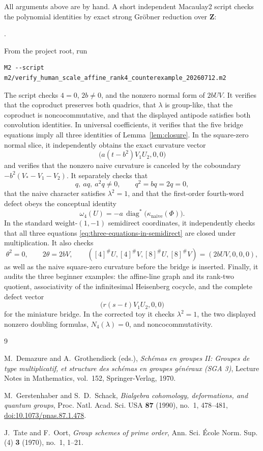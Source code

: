 \documentclass[11pt]{amsart}
\theoremstyle{definition}
\theoremstyle{remark}
\newcommand{\Z}{\mathbf Z}
\begin{document}
All arguments above are by hand.  A short independent Macaulay2 script
checks the polynomial identities by exact strong Gr\"obner reduction over
\(\Z\):
\begin{center}
 .
\end{center}
From the project root, run
\begin{verbatim}
M2 --script m2/verify_human_scale_affine_rank4_counterexample_20260712.m2
\end{verbatim}
The script checks \(4=0\), \(2b\ne0\), and the nonzero normal form of
\(2bUV\).  It verifies that the coproduct preserves both quadrics, that
\(\lambda\) is group-like, that the coproduct is noncocommutative, and
that the displayed antipode satisfies both convolution identities.  In
universal coefficients, it verifies that the five bridge equations imply
all three identities of Lemma~\ref{lem:closure}.  In the square-zero
normal slice, it independently obtains the exact curvature vector
\[
 \bigl(a(t-b^2)V_1U_2,0,0\bigr)
\]
and verifies that the nonzero naive curvature is canceled by the
coboundary \(-b^2(V_*-V_1-V_2)\).  It separately checks that
\[
 q,\ aq,\ a^2q\ne0,\qquad q^2=bq=2q=0,
\]
that the naive character satisfies \(\lambda^2=1\), and that the
first-order fourth-word defect obeys the conceptual identity
\[
 \omega_4(U)
 =-a\,\operatorname{diag}^*
   \bigl(\kappa_{\mathrm{naive}}(\Phi)\bigr).
\]
In the standard weight-\((1,-1)\) semidirect coordinates, it independently
checks that all three equations
\eqref{eq:three-equations-in-semidirect} are closed under multiplication.
It also checks
\[
 \theta^2=0,\qquad 2\theta=2bV,\qquad
 ([4]^\#U,[4]^\#V,[8]^\#U,[8]^\#V)=(2bUV,0,0,0),
\]
as well as the naive square-zero curvature before the bridge is inserted.
Finally, it audits the three beginner examples: the affine-line graph
and its rank-two quotient, associativity of the infinitesimal Heisenberg
cocycle, and the complete defect vector
\[
 \bigl(r(s-t)V_1U_2,0,0\bigr)
\]
for the miniature bridge.  In the corrected toy it checks
\(\lambda^2=1\), the two displayed nonzero doubling formulas,
\(N_4(\lambda)=0\), and noncocommutativity.

\begin{thebibliography}{9}

M.~Demazure and A.~Grothendieck (eds.),
\emph{Sch\'emas en groupes II: Groupes de type multiplicatif, et structure
des sch\'emas en groupes g\'en\'eraux (SGA 3)},
Lecture Notes in Mathematics, vol.~152, Springer-Verlag, 1970.

M.~Gerstenhaber and S.~D.~Schack,
\emph{Bialgebra cohomology, deformations, and quantum groups},
Proc. Natl. Acad. Sci. USA \textbf{87} (1990), no.~1, 478--481,
\href{https://doi.org/10.1073/pnas.87.1.478}
{doi:10.1073/pnas.87.1.478}.

J.~Tate and F.~Oort,
\emph{Group schemes of prime order},
Ann. Sci. \'Ecole Norm. Sup. (4) \textbf{3} (1970), no.~1, 1--21.

\end{thebibliography}
\end{document}

